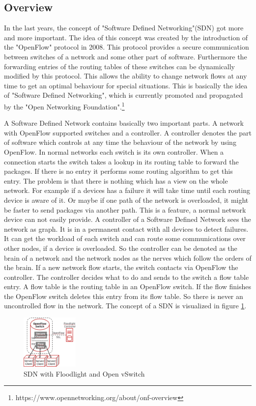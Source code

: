 \subsection{Overview}
In the last years, the concept of "Software Defined Networking"(SDN) got more and more important. The idea of this concept was created by the introduction of the "OpenFlow" protocol in 2008\cite{Mc2008}. This protocol provides a secure communication between switches of a network and some other part of software. Furthermore the forwarding entries of the routing tables of these switches can be dynamically modified by this protocol. This allows the ability to change network flows at any time to get an optimal behaviour for special situations. This is basically the idea of "Software Defined Networking", which is currently promoted and propagated by the "Open Networking Foundation".\footnote{https://www.opennetworking.org/about/onf-overview} 

A Software Defined Network contains basically two important parts. A network with OpenFlow supported switches and a controller. A controller denotes the part of software which controls at any time the behaviour of the network by using OpenFlow. In normal networks each switch is its own controller. When a connection starts the switch takes a lookup in its routing table to forward the packages. If there is no entry it performs some routing algorithm to get this entry. The problem is that there is nothing which has a view on the whole network. For example if a devices has a failure it will take time until each routing device is aware of it. Or maybe if one path of the network is overloaded, it might be faster to send packages via another path. This is a feature, a normal network device can not easily provide. A controller of a Software Defined Network sees the network as graph. It is in a permanent contact with all devices to detect failures. It can get the workload of each switch and can route some communications over other nodes, if a device is overloaded. So the controller can be denoted as the brain of a network and the network nodes as the nerves which follow the orders of the brain. If a new network flow starts, the switch contacts via OpenFlow the controller. The controller decides what to do and sends to the switch a flow table entry. A flow table is the routing table in an OpenFlow switch. If the flow finishes the OpenFlow switch deletes this entry from its flow table. So there is never an uncontrolled flow in the network. The concept of a SDN is visualized in figure \ref{sdn}.\\
\begin{figure}[ht]
\centering
\includegraphics[width=0.25\textwidth]{img/sdn} 

\caption{SDN with Floodlight and Open vSwitch}
\label{sdn}
\end{figure}
 


